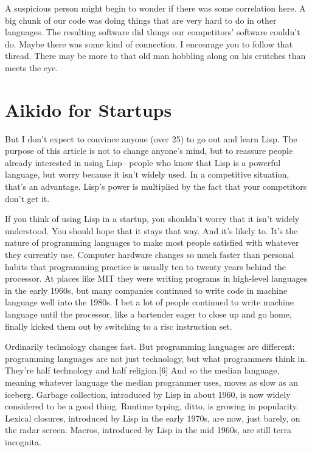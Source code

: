 \documentclass[10pt,twoside,openright]{memoir}
\begin{document}
A suspicious person might begin to wonder if there was some correlation here. A big chunk of our code was doing things that are very hard to do in other languages. The resulting software did things our competitors' software couldn't do. Maybe there was some kind of connection. I encourage you to follow that thread. There may be more to that old man hobbling along on his crutches than meets the eye.

\section{Aikido for Startups}

But I don't expect to convince anyone (over 25) to go out and learn Lisp. The purpose of this article is not to change anyone's mind, but to reassure people already interested in using Lisp-- people who know that Lisp is a powerful language, but worry because it isn't widely used. In a competitive situation, that's an advantage. Lisp's power is multiplied by the fact that your competitors don't get it.

If you think of using Lisp in a startup, you shouldn't worry that it isn't widely understood. You should hope that it stays that way. And it's likely to. It's the nature of programming languages to make most people satisfied with whatever they currently use. Computer hardware changes so much faster than personal habits that programming practice is usually ten to twenty years behind the processor. At places like MIT they were writing programs in high-level languages in the early 1960s, but many companies continued to write code in machine language well into the 1980s. I bet a lot of people continued to write machine language until the processor, like a bartender eager to close up and go home, finally kicked them out by switching to a risc instruction set.

Ordinarily technology changes fast. But programming languages are different: programming languages are not just technology, but what programmers think in. They're half technology and half religion.[6] And so the median language, meaning whatever language the median programmer uses, moves as slow as an iceberg. Garbage collection, introduced by Lisp in about 1960, is now widely considered to be a good thing. Runtime typing, ditto, is growing in popularity. Lexical closures, introduced by Lisp in the early 1970s, are now, just barely, on the radar screen. Macros, introduced by Lisp in the mid 1960s, are still terra incognita.
\end{document}
